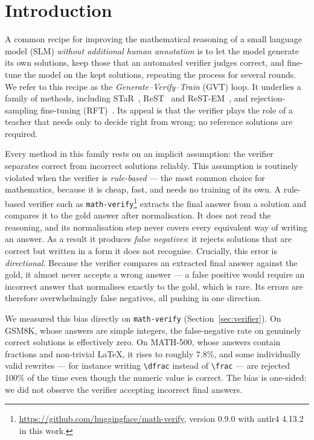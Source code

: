 \documentclass[runningheads]{llncs}
\begin{document}
\section{Introduction}
\label{sec:intro}

A common recipe for improving the mathematical reasoning of a small
language model (SLM) \emph{without additional human annotation} is to let
the model generate its own solutions, keep those that an automated
verifier judges correct, and fine-tune the model on the kept solutions,
repeating the process for several rounds. We refer to this recipe as the
\emph{Generate--Verify--Train} (GVT) loop. It underlies a family of
methods, including STaR~\cite{ref_star}, ReST~\cite{ref_rest} and
ReST-EM~\cite{ref_restem}, and rejection-sampling fine-tuning
(RFT)~\cite{ref_rft}. Its appeal is that the verifier plays the role of a
teacher that needs only to decide right from wrong; no reference solutions
are required.

Every method in this family rests on an implicit assumption: the verifier
separates correct from incorrect solutions reliably. This assumption is
routinely violated when the verifier is \emph{rule-based} --- the most
common choice for mathematics, because it is cheap, fast, and needs no
training of its own. A rule-based verifier such as
\texttt{math-verify}\footnote{\url{https://github.com/huggingface/math-verify},
version 0.9.0 with antlr4 4.13.2 in this work.}
extracts the final answer from a solution and compares it to the gold
answer after normalisation. It does not read the reasoning, and its
normalisation step never covers every equivalent way of writing an answer.
As a result it produces \emph{false negatives}: it rejects solutions that
are correct but written in a form it does not recognise. Crucially, this
error is \emph{directional}. Because the verifier compares an extracted
final answer against the gold, it almost never accepts a wrong answer --- a
false positive would require an incorrect answer that normalises exactly to
the gold, which is rare. Its errors are therefore overwhelmingly false
negatives, all pushing in one direction.

We measured this bias directly on \texttt{math-verify}
(Section~\ref{sec:verifier}). On GSM8K, whose answers are simple integers,
the false-negative rate on genuinely correct solutions is effectively
zero. On MATH-500, whose answers contain fractions and non-trivial
\LaTeX{}, it rises to roughly 7.8\%, and some individually valid rewrites
--- for instance writing \verb|\dfrac| instead of \verb|\frac| --- are
rejected 100\% of the time even though the numeric value is correct. The
bias is one-sided: we did not observe the verifier accepting incorrect
final answers.
\end{document}
